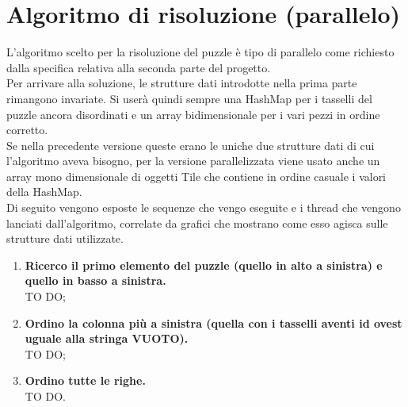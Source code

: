 % 
%
%

\section{Algoritmo di risoluzione (parallelo)}
L'algoritmo scelto per la risoluzione del puzzle è tipo di parallelo come richiesto dalla specifica relativa alla seconda parte del progetto. \\
Per arrivare alla soluzione, le strutture dati introdotte nella prima parte rimangono invariate. Si userà quindi sempre una HashMap per i tasselli del puzzle ancora disordinati e un array bidimensionale per i vari pezzi in ordine corretto. \\
Se nella precedente versione queste erano le uniche due strutture dati di cui l'algoritmo aveva bisogno, per la versione parallelizzata viene usato anche un array mono dimensionale di oggetti Tile che contiene in ordine casuale i valori della HashMap. \\
Di seguito vengono esposte le sequenze che vengo eseguite e i thread che vengono lanciati dall'algoritmo, correlate da grafici che mostrano come esso agisca sulle strutture dati utilizzate.

	\begin{enumerate}
		\item \textbf{Ricerco il primo elemento del puzzle (quello in alto a sinistra) e quello in basso a sinistra.} \\
		TO DO;
		\item \textbf{Ordino la colonna più a sinistra (quella con i tasselli aventi id ovest uguale alla stringa VUOTO).} \\
		TO DO;
		\item \textbf{Ordino tutte le righe.} \\
		TO DO.
	\end{enumerate}




